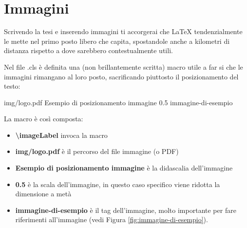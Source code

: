 \chapter{Immagini}
Scrivendo la tesi e inserendo immagini ti accorgerai che LaTeX tendenzialmente le mette nel primo posto libero che capita, spostandole anche a kilometri di distanza rispetto a dove sarebbero contestualmente utili.

Nel file .cls è definita una (non brillantemente scritta) macro utile a far si che le immagini rimangano al loro posto, sacrificando piuttosto il posizionamento del testo:

\imageLabel
{img/logo.pdf}
{Esempio di posizionamento immagine}
{0.5}
{immagine-di-esempio}

La macro è così composta:
\begin{itemize}
    \item \textbf{\textbackslash imageLabel} invoca la macro 
    \item \textbf{{img/logo.pdf}} è il percorso del file immagine (o PDF)
    \item \textbf{{Esempio di posizionamento immagine}} è la didascalia dell'immagine 
    \item \textbf{{0.5}} è la scala dell'immagine, in questo caso specifico viene ridotta la dimensione a metà
    \item \textbf{{immagine-di-esempio}} è il tag dell'immagine, molto importante per fare riferimenti all'immagine (vedi Figura \ref{fig:immagine-di-esempio}).
\end{itemize}